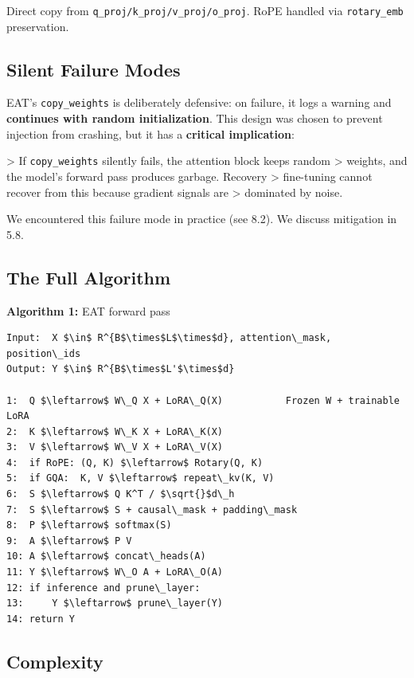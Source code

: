 Direct copy from \texttt{q\_proj/k\_proj/v\_proj/o\_proj}. RoPE handled via \texttt{rotary\_emb} 
preservation.

\subsection{Silent Failure Modes}

EAT's \texttt{copy\_weights} is deliberately defensive: on failure, it logs a 
warning and \textbf{continues with random initialization}. This design was chosen 
to prevent injection from crashing, but it has a \textbf{critical implication}:

\textgreater{} If \texttt{copy\_weights} silently fails, the attention block keeps random 
\textgreater{} weights, and the model's forward pass produces garbage. Recovery 
\textgreater{} fine-tuning cannot recover from this because gradient signals are 
\textgreater{} dominated by noise.

We encountered this failure mode in practice (see  8.2). We discuss 
mitigation in  5.8.

\subsection{The Full Algorithm}

\textbf{Algorithm 1:} EAT forward pass
\begin{lstlisting}
Input:  X $\in$ R^{B$\times$L$\times$d}, attention\_mask, position\_ids
Output: Y $\in$ R^{B$\times$L'$\times$d}

1:  Q $\leftarrow$ W\_Q X + LoRA\_Q(X)           Frozen W + trainable LoRA
2:  K $\leftarrow$ W\_K X + LoRA\_K(X)
3:  V $\leftarrow$ W\_V X + LoRA\_V(X)
4:  if RoPE: (Q, K) $\leftarrow$ Rotary(Q, K)
5:  if GQA:  K, V $\leftarrow$ repeat\_kv(K, V)
6:  S $\leftarrow$ Q K^T / $\sqrt{}$d\_h
7:  S $\leftarrow$ S + causal\_mask + padding\_mask
8:  P $\leftarrow$ softmax(S)
9:  A $\leftarrow$ P V
10: A $\leftarrow$ concat\_heads(A)
11: Y $\leftarrow$ W\_O A + LoRA\_O(A)
12: if inference and prune\_layer:
13:     Y $\leftarrow$ prune\_layer(Y)
14: return Y
\end{lstlisting}

\subsection{Complexity}

